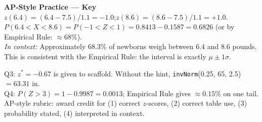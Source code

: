 \documentclass[10pt]{article}
\begin{document}
\vspace{0.16in}

\begin{tcolorbox}[colback=redbg, colframe=redacc, boxrule=0.8pt, arc=2mm,
    left=4mm, right=4mm, top=3mm, bottom=3mm]
\small\textbf{AP-Style Practice — Key}\\[6pt]
$z(6.4) = (6.4-7.5)/1.1 = -1.0$;\quad $z(8.6) = (8.6-7.5)/1.1 = +1.0$.\\
$P(6.4 < X < 8.6) = P(-1 < Z < 1) = 0.8413 - 0.1587 = \mathbf{0.6826}$
(or by Empirical Rule: $\approx 68\%$).\\[4pt]
\textit{In context:} Approximately 68.3\% of newborns weigh between 6.4 and 8.6 pounds.
This is consistent with the Empirical Rule: the interval is exactly $\mu \pm 1\sigma$.
\end{tcolorbox}

\begin{teachernote}
Q3: $z^* = -0.67$ is given to scaffold. Without the hint, \texttt{invNorm}(0.25, 65, 2.5) $= 63.31$ in.\\
Q4: $P(Z > 3) = 1 - 0.9987 = 0.0013$; Empirical Rule gives $\approx 0.15\%$ on one tail.\\
AP-style rubric: award credit for (1) correct $z$-scores, (2) correct table use, (3) probability stated, (4) interpreted in context.
\end{teachernote}
\end{document}
